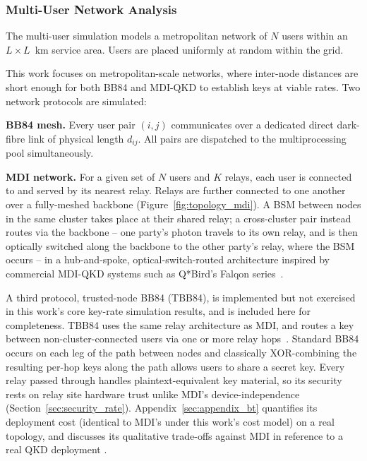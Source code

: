 \documentclass[12pt]{article}
\begin{document}
\subsubsection{Multi-User Network Analysis}
\label{sec:network_analysis}

The multi-user simulation models a metropolitan network of $N$ users within an $L \times L$~km service area. Users are placed uniformly at random within the grid.

This work focuses on metropolitan-scale networks, where inter-node distances are short enough for both BB84 and MDI-QKD to establish keys at viable rates. Two network protocols are simulated:

\textbf{BB84 mesh.} Every user pair $(i,j)$ communicates over a dedicated direct dark-fibre link of physical length $d_{ij}$. All pairs are dispatched to the multiprocessing pool simultaneously.

\textbf{MDI network.} For a given set of $N$ users and $K$ relays, each user is connected to and served by its nearest relay. Relays are further connected to one another over a fully-meshed backbone (Figure~\ref{fig:topology_mdi}). A BSM between nodes in the same cluster takes place at their shared relay; a cross-cluster pair instead routes via the backbone -- one party's photon travels to its own relay, and is then optically switched along the backbone to the other party's relay, where the BSM occurs -- in a hub-and-spoke, optical-switch-routed architecture inspired by commercial MDI-QKD systems such as Q*Bird's Falqon series~\cite{qbird_falqon}.

A third protocol, trusted-node BB84 (TBB84), is implemented but not exercised in this work's core key-rate simulation results, and is included here for completeness. TBB84 uses the same relay architecture as MDI, and routes a key between non-cluster-connected users via one or more relay hops~\cite{Elliott_2002}. Standard BB84 occurs on each leg of the path between nodes and classically XOR-combining the resulting per-hop keys along the path allows users to share a secret key. Every relay passed through handles plaintext-equivalent key material, so its security rests on relay site hardware trust unlike MDI's device-independence (Section~\ref{sec:security_rate}). Appendix~\ref{sec:appendix_bt} quantifies its deployment cost (identical to MDI's under this work's cost model) on a real topology, and discusses its qualitative trade-offs against MDI in reference to a real QKD deployment \cite{Lord_2023}.
\end{document}

